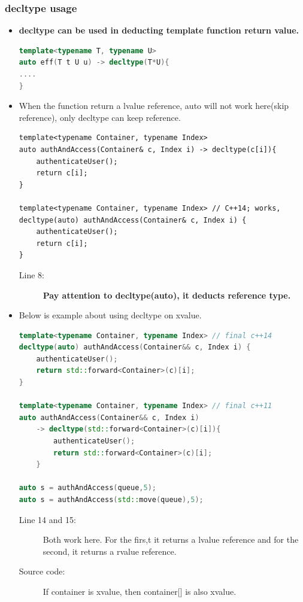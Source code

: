 \documentclass[a4paper,11pt,twoside]{book}
\begin{document}
\subsubsection{decltype usage}
\begin{itemize}
	\item \textbf{decltype can be used in deducting template function return value.}
\begin{lstlisting}[frame=single, language=c++, mathescape=true]
template<typename T, typename U>
auto eff(T t U u) -> decltype(T*U){
....
}
\end{lstlisting}
	\item When the function return a lvalue reference, auto will not work here(skip reference), only decltype can keep reference.
\begin{lstlisting}
template<typename Container, typename Index>
auto authAndAccess(Container& c, Index i) -> decltype(c[i]){
	authenticateUser();
	return c[i];
}

template<typename Container, typename Index> // C++14; works,
decltype(auto) authAndAccess(Container& c, Index i) {
	authenticateUser();
	return c[i];
}
\end{lstlisting}
\begin{description}
	\item[Line 8:] \textbf{Pay attention to decltype(auto), it deducts reference type.}
\end{description}
	
	\item Below is example about using decltype on xvalue. 
\begin{lstlisting}[frame=single, language=c++, mathescape=true]
template<typename Container, typename Index> // final c++14
decltype(auto) authAndAccess(Container&& c, Index i) {
	authenticateUser();
	return std::forward<Container>(c)[i];
}
	
template<typename Container, typename Index> // final c++11
auto authAndAccess(Container&& c, Index i)
	-> decltype(std::forward<Container>(c)[i]){
		authenticateUser();
		return std::forward<Container>(c)[i];
	}

auto s = authAndAccess(queue,5);
auto s = authAndAccess(std::move(queue),5); 
\end{lstlisting}
\begin{description}
	\item[Line 14 and 15:] Both work here. For the firs,t it returns a lvalue reference and for the second, it returns a rvalue reference.
	\item[Source code:] If container is xvalue, then container[] is also xvalue. 
\end{description}
	

\end{itemize}
\end{document}
